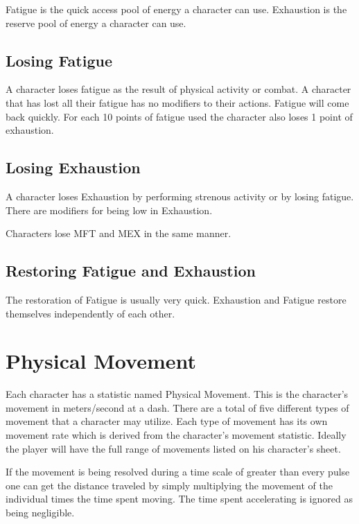 Fatigue is the quick access pool of energy a character can use.
Exhaustion is the reserve pool of energy a character can use. 

\subsection{Losing Fatigue}

A character loses fatigue as the result of physical activity or combat. 
A character that has lost all their fatigue has no modifiers to their actions.
Fatigue will come back quickly. For each 10 points of fatigue used the character 
also loses 1 point of exhaustion.

\subsection{Losing Exhaustion}
A character loses Exhaustion by performing strenous activity or by losing 
fatigue. There are modifiers for being low in Exhaustion.



Characters lose MFT and MEX in the same manner.



\subsection{Restoring Fatigue and Exhaustion}

The restoration of Fatigue is usually very quick. Exhaustion and Fatigue
restore themselves independently of each other.



\section{Physical Movement}

Each character has a statistic named Physical Movement. This is the character's
movement in meters/second at a dash. There are a total of five different types
of movement that a character may utilize. Each type of movement has its own
movement rate which is derived from the character's movement statistic. 
Ideally the player will have the full range of movements listed on his 
character's sheet. 



If the movement is being resolved during a time scale of greater than every
pulse one can get the distance traveled by simply multiplying the movement 
of the individual times the time spent moving. The time spent accelerating
is ignored as being negligible.

